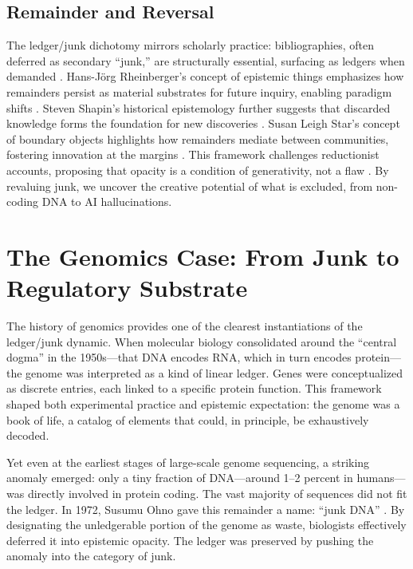 \documentclass[11pt]{article}
\begin{document}
\subsection{Remainder and Reversal}
The ledger/junk dichotomy mirrors scholarly practice: bibliographies, often deferred as secondary ``junk,'' are structurally essential, surfacing as ledgers when demanded \citep{rheinberger1997}. Hans-Jörg Rheinberger’s concept of epistemic things emphasizes how remainders persist as material substrates for future inquiry, enabling paradigm shifts \citep{rheinberger1997}. Steven Shapin’s historical epistemology further suggests that discarded knowledge forms the foundation for new discoveries \citep{shapin1985}. Susan Leigh Star’s concept of boundary objects highlights how remainders mediate between communities, fostering innovation at the margins \citep{star1989}. This framework challenges reductionist accounts, proposing that opacity is a condition of generativity, not a flaw \citep{barad2007, bowker2005}. By revaluing junk, we uncover the creative potential of what is excluded, from non-coding DNA to AI hallucinations.

\section{The Genomics Case: From Junk to Regulatory Substrate}

The history of genomics provides one of the clearest instantiations of the ledger/junk dynamic. When molecular biology consolidated around the ``central dogma'' in the 1950s---that DNA encodes RNA, which in turn encodes protein---the genome was interpreted as a kind of linear ledger. Genes were conceptualized as discrete entries, each linked to a specific protein function. This framework shaped both experimental practice and epistemic expectation: the genome was a book of life, a catalog of elements that could, in principle, be exhaustively decoded.

Yet even at the earliest stages of large-scale genome sequencing, a striking anomaly emerged: only a tiny fraction of DNA---around 1--2 percent in humans---was directly involved in protein coding. The vast majority of sequences did not fit the ledger. In 1972, Susumu Ohno gave this remainder a name: ``junk DNA'' \citep{ohno1972}. By designating the unledgerable portion of the genome as waste, biologists effectively deferred it into epistemic opacity. The ledger was preserved by pushing the anomaly into the category of junk.
\end{document}
